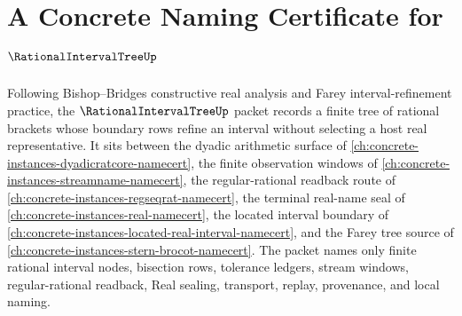 \chapter{A Concrete Naming Certificate for $\RationalIntervalTreeUp$}
\label{ch:concrete-instances-rational-interval-tree-namecert}

Following Bishop--Bridges constructive real analysis and Farey interval-refinement practice, the $\RationalIntervalTreeUp$ packet records a finite tree of rational brackets whose boundary rows refine an interval without selecting a host real representative. It sits between the dyadic arithmetic surface of \autoref{ch:concrete-instances-dyadicratcore-namecert}, the finite observation windows of \autoref{ch:concrete-instances-streamname-namecert}, the regular-rational readback route of \autoref{ch:concrete-instances-regseqrat-namecert}, the terminal real-name seal of \autoref{ch:concrete-instances-real-namecert}, the located interval boundary of \autoref{ch:concrete-instances-located-real-interval-namecert}, and the Farey tree source of \autoref{ch:concrete-instances-stern-brocot-namecert}. The packet names only finite rational interval nodes, bisection rows, tolerance ledgers, stream windows, regular-rational readback, Real sealing, transport, replay, provenance, and local naming.

